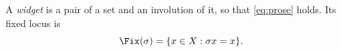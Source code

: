 \begin{definition}[Widget]\label{sy-0001}
A \emph{widget} is a pair of a set and an involution of it, so that \eqref{eq:prose} holds. Its fixed locus is
\begin{equation}\label{eq:fix}
\Fix(\sigma) = \{x \in X : \sigma x = x\}.
\end{equation}
\end{definition}